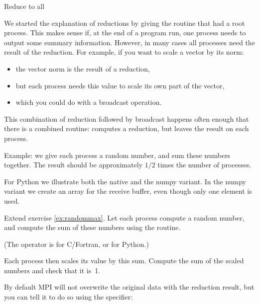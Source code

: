  {Reduce to all}

We started the explanation of reductions by giving the routine that
had a root process. This makes sense if, at the end of a program run,
one process needs to output some summary information. However, in many
cases all processes need the result of the reduction. For example, if
you want to scale a vector by its norm:
\begin{itemize}
\item the vector norm is the result of a reduction,
\item but each process needs this value to scale its own part of the
  vector,
\item which you could do with a broadcast operation.
\end{itemize}
This combination of reduction followed by broadcast happens often
enough that there is a combined routine:  computes a
reduction, but leaves the result on each process.


Example: we give each process a random number, and sum these numbers together.
The result should be approximately $1/2$ times the number of processes.


For Python we illustrate both the native and the numpy variant. In the
numpy variant we create an array for the receive buffer, even though
only one element is used.


\begin{exercise}
  \label{ex:randommaxscale}
  Extend  exercise \ref{ex:randommax}.
  Let each process compute a random number,
  and compute the sum of these numbers using the 
  routine.

  (The operator is  for C/Fortran, or  for
  Python.)
  
  Each process then scales its value
  by this sum. Compute the sum of the scaled numbers and check that it is~1.
\end{exercise}

By default MPI will not overwrite the original data with the reduction
result, but you can tell it to do so
using the  specifier:


